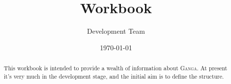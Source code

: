 \documentclass{howto}
\title{\ganga Workbook}
\author{\ganga Development Team}
\date{\today}
\def\ganga {\textsc{Ganga}\xspace}
\begin{document}
\maketitle
\begin{abstract}
\noindent
This workbook is intended to provide a wealth of information about \ganga.  At
present it's very much in the development stage, and the initial aim is to
define the structure.
\end{abstract}






\end{document}
